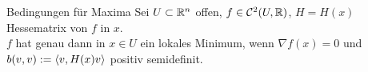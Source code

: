 \documentclass[main.tex]{subfiles}
\begin{document}
\begin{karte}{Bedingungen für Maxima}
    Sei \(U \subset \mathbb{R}^n\) offen, \(f \in \mathcal{C}^2(U,\mathbb{R})\), 
    \( H = H(x) \) Hessematrix von \(f\) in \(x\).\\
    \(f\) hat genau dann in \(x\in U\) ein lokales Minimum, wenn
    \( \nabla f(x) = 0 \) und \( b(v,v) := \langle v, H(x)v \rangle \)
    positiv semidefinit.
\end{karte}
\end{document}
